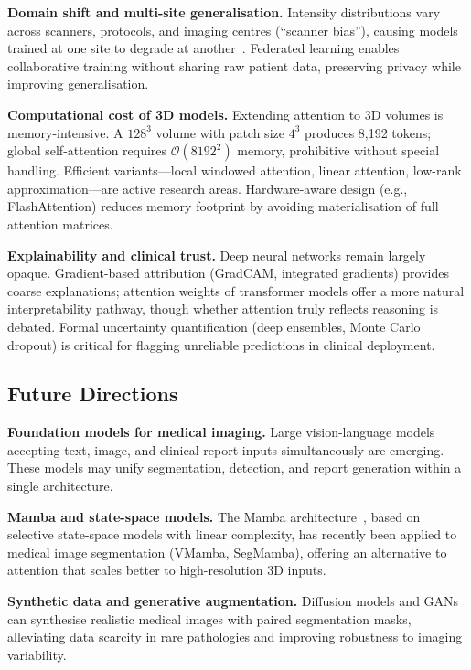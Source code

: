 \documentclass[preprint,12pt,authoryear]{elsarticle}
\begin{document}
\textbf{Domain shift and multi-site generalisation.} Intensity distributions
vary across scanners, protocols, and imaging centres (``scanner bias''), causing
models trained at one site to degrade at another~\citep{qureshi2023review}.
Federated learning enables collaborative training without sharing raw patient
data, preserving privacy while improving generalisation.

\textbf{Computational cost of 3D models.} Extending attention to 3D volumes is
memory-intensive. A $128^3$ volume with patch size $4^3$ produces 8,192 tokens;
global self-attention requires $\mathcal{O}(8192^2)$ memory, prohibitive without
special handling. Efficient variants---local windowed attention, linear attention,
low-rank approximation---are active research areas. Hardware-aware design (e.g.,
FlashAttention) reduces memory footprint by avoiding materialisation of full
attention matrices.

\textbf{Explainability and clinical trust.} Deep neural networks remain largely
opaque. Gradient-based attribution (GradCAM, integrated gradients) provides
coarse explanations; attention weights of transformer models offer a more natural
interpretability pathway, though whether attention truly reflects reasoning is
debated. Formal uncertainty quantification (deep ensembles, Monte Carlo dropout)
is critical for flagging unreliable predictions in clinical deployment.

\subsection{Future Directions}
\label{sec:future}

\textbf{Foundation models for medical imaging.} Large vision-language models
accepting text, image, and clinical report inputs simultaneously are emerging.
These models may unify segmentation, detection, and report generation within a
single architecture.

\textbf{Mamba and state-space models.} The Mamba architecture~\citep{gu2023mamba},
based on selective state-space models with linear complexity, has recently been
applied to medical image segmentation (VMamba, SegMamba), offering an alternative
to attention that scales better to high-resolution 3D inputs.

\textbf{Synthetic data and generative augmentation.} Diffusion models and GANs
can synthesise realistic medical images with paired segmentation masks,
alleviating data scarcity in rare pathologies and improving robustness to
imaging variability.
\end{document}

